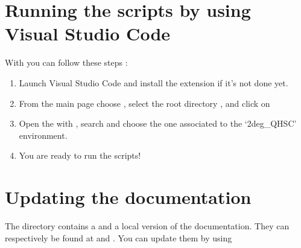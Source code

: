 \documentclass[letterpaper,10pt,english]{sphinxmanual}
\begin{document}
\section{Running the scripts by using Visual Studio Code}
\label{\detokenize{usage:running-the-scripts-by-using-visual-studio-code}}
\sphinxAtStartPar
With  you can follow these steps :
\begin{enumerate}
%
\item {} 
\sphinxAtStartPar
Launch Visual Studio Code and install the  extension if it’s not done yet.

\item {} 
\sphinxAtStartPar
From the main page choose  , select the root directory , and click on

\item {} 
\sphinxAtStartPar
Open the  with , search
 and choose the one associated to the ‘2deg\_QH\sphinxhyphen{}SC’
environment.

\item {} 
\sphinxAtStartPar
You are ready to run the scripts!

\end{enumerate}


\section{Updating the documentation}
\label{\detokenize{usage:updating-the-documentation}}
\sphinxAtStartPar
The  directory contains a  and a local  version of the documentation.
They can respectively be found at 
and . You can update them by using

\begin{sphinxVerbatim}[commandchars=\\\{\}]
  
 
 
 
\end{sphinxVerbatim}
\end{document}

